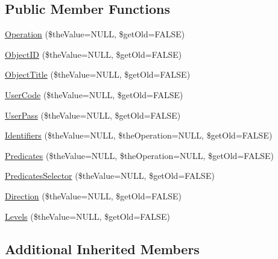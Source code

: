 \subsection*{Public Member Functions}
\begin{DoxyCompactItemize}
\item 
\hyperlink{class_c_warehouse_wrapper_client_a099ef5aef1883aa5b394c7086a818496}{Operation} (\$the\-Value=N\-U\-L\-L, \$get\-Old=F\-A\-L\-S\-E)
\item 
\hyperlink{class_c_warehouse_wrapper_client_a2de833fe9026867bfd80630d5e49895d}{Object\-I\-D} (\$the\-Value=N\-U\-L\-L, \$get\-Old=F\-A\-L\-S\-E)
\item 
\hyperlink{class_c_warehouse_wrapper_client_a7c137562a7fdb8941dbe5c6cddd66317}{Object\-Title} (\$the\-Value=N\-U\-L\-L, \$get\-Old=F\-A\-L\-S\-E)
\item 
\hyperlink{class_c_warehouse_wrapper_client_ac953bbdc9dd6ccffa7ddfb8f59bbaf26}{User\-Code} (\$the\-Value=N\-U\-L\-L, \$get\-Old=F\-A\-L\-S\-E)
\item 
\hyperlink{class_c_warehouse_wrapper_client_a60e22139d7af5c828dcac8098e16ec6a}{User\-Pass} (\$the\-Value=N\-U\-L\-L, \$get\-Old=F\-A\-L\-S\-E)
\item 
\hyperlink{class_c_warehouse_wrapper_client_a39a624769f7cd1aebca73e7ba2c042e2}{Identifiers} (\$the\-Value=N\-U\-L\-L, \$the\-Operation=N\-U\-L\-L, \$get\-Old=F\-A\-L\-S\-E)
\item 
\hyperlink{class_c_warehouse_wrapper_client_a13557a813d85e638d97b729a27631af7}{Predicates} (\$the\-Value=N\-U\-L\-L, \$the\-Operation=N\-U\-L\-L, \$get\-Old=F\-A\-L\-S\-E)
\item 
\hyperlink{class_c_warehouse_wrapper_client_a0454ae1eed1fd5e05e4018c54b0f8197}{Predicates\-Selector} (\$the\-Value=N\-U\-L\-L, \$get\-Old=F\-A\-L\-S\-E)
\item 
\hyperlink{class_c_warehouse_wrapper_client_a74a9e226190002542c67c64e766b91cd}{Direction} (\$the\-Value=N\-U\-L\-L, \$get\-Old=F\-A\-L\-S\-E)
\item 
\hyperlink{class_c_warehouse_wrapper_client_a858974f6dedaa731da4fe26664a21ab7}{Levels} (\$the\-Value=N\-U\-L\-L, \$get\-Old=F\-A\-L\-S\-E)
\end{DoxyCompactItemize}
\subsection*{Additional Inherited Members}


